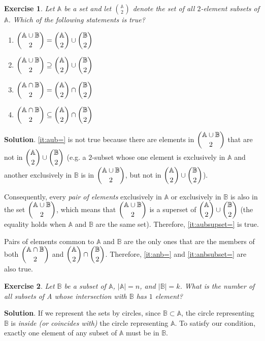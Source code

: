 \documentclass[11pt]{book}
\theoremstyle{definition}
\theoremstyle{plain}
\newtheorem{exercise}{Exercise}
\theoremstyle{definition}
\theoremstyle{problemstyle}
\theoremstyle{remark}
\theoremstyle{definition}
\begin{document}
\begin{exercise}
    \label{ex:1.8.20}
    Let $\mathbb{A}$ be a set and let $\binom{\mathbb{A}}{2}$ denote the set of all $2$-element subsets of $\mathbb{A}$.  Which of the following statements is true?
    \begin{enumerate}[label=(\alph*)]
        \item\label{it:aub=}$\dbinom{\mathbb{A}\cup\mathbb{B}}{2}=\dbinom{\mathbb{A}}{2}\cup\dbinom{\mathbb{B}}{2}$
        \item\label{it:aubsupset=}$\dbinom{\mathbb{A}\cup\mathbb{B}}{2}\supseteq\dbinom{\mathbb{A}}{2}\cup\dbinom{\mathbb{B}}{2}$
        \item\label{it:anb=}$\dbinom{\mathbb{A}\cap\mathbb{B}}{2}=\dbinom{\mathbb{A}}{2}\cap\dbinom{\mathbb{B}}{2}$

        \item\label{it:anbsubset=}$\dbinom{\mathbb{A}\cap\mathbb{B}}{2}\subseteq\dbinom{\mathbb{A}}{2}\cap\dbinom{\mathbb{B}}{2}$
    \end{enumerate}
\end{exercise}
\textbf{Solution}. \ref{it:aub=} is not true because there are elements in $\dbinom{\mathbb{A}\cup\mathbb{B}}{2}$ that are not in $\dbinom{\mathbb{A}}{2}\cup\dbinom{\mathbb{B}}{2}$ (e.g. a $2$-subset whose one element is exclusively in $\mathbb{A}$ and another exclusively in $\mathbb{B}$ is in $\dbinom{\mathbb{A}\cup\mathbb{B}}{2}$, but not in $\dbinom{\mathbb{A}}{2}\cup\dbinom{\mathbb{B}}{2}$). 

Consequently, every \emph{pair of elements} exclusively in $\mathbb{A}$ or exclusively in $\mathbb{B}$ is also in the set $\dbinom{\mathbb{A}\cup\mathbb{B}}{2}$, which means that $\dbinom{\mathbb{A}\cup\mathbb{B}}{2}$ is a superset of $\dbinom{\mathbb{A}}{2}\cup\dbinom{\mathbb{B}}{2}$ (the equality holds when $\mathbb{A}$ and $\mathbb{B}$ are the same set). Therefore, \ref{it:aubsupset=} is true.

Pairs of elements common to $\mathbb{A}$ and $\mathbb{B}$ are the only ones that are the members of both $\dbinom{\mathbb{A}\cap\mathbb{B}}{2}$ and $\dbinom{\mathbb{A}}{2}\cap\dbinom{\mathbb{B}}{2}$. Therefore, \ref{it:anb=} and \ref{it:anbsubset=} are also true.
\begin{exercise}
    \label{ex:1.8.21}
    Let $\mathbb{B}$ be a subset of $\mathbb{A}$, $\lvert\mathbb{A}\rvert=n$, and $\lvert\mathbb{B}\rvert=k$. What is the number of all subsets of A whose intersection with $\mathbb{B}$ has $1$ element?
\end{exercise}
\textbf{Solution}.
If we represent the sets by circles, since $\mathbb{B}\subset\mathbb{A}$, the circle representing $\mathbb{B}$ is \emph{inside (or coincides with)} the circle representing $\mathbb{A}$. To satisfy our condition, exactly one element of any subset of $\mathbb{A}$ must be in $\mathbb{B}$. 
\end{document}
